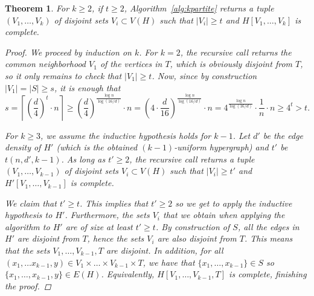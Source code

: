 \documentclass{amsart}
\newtheorem{theorem}[subsection]{Theorem}
\begin{document}
    \begin{theorem}
        For $k \geq 2$, if $t \geq 2$, Algorithm~\ref{alg:kpartite} returns a tuple $(V_1, \dots, V_k)$ of disjoint sets $V_i \subset V(H)$ such that
        $|V_i| \geq t$ and $H[V_1, \dots, V_k]$ is complete.

        \begin{proof}
            We proceed by induction on $k$.
            For $k=2$, the recursive call returns the common neighborhood $V_1$ of the vertices in $T$,
            which is obviously disjoint from $T$, so it only remains to check that $|V_1| \geq t$.
            Now, since by construction $|V_1| = |S| \geq s$, it is enough that
            \[
                s
                = \left\lceil \left( \frac{d}{4}\right)^t \cdot n\right\rceil
                \geq \left( \frac{d}{4}\right)^{\frac{\log n}{\log(16/d)}}  \cdot n
                = \left( 4 \cdot \frac{d}{16}\right)^{\frac{\log n}{\log(16/d)}} \cdot n
                = 4^{\frac{\log n}{\log(16/d)}} \cdot \frac{1}{n} \cdot n
                \geq 4^t
                > t.
            \]

            For $k \geq 3$, we assume the inductive hypothesis holds for $k-1$.
            Let $d'$ be the edge density of $H'$ (which is the obtained $(k-1)$-uniform hypergraph)
            and $t'$ be $t(n, d', k-1)$.
            As long as $t' \geq 2$, the recursive call returns
            a tuple $(V_1, \dots, V_{k-1})$ of disjoint sets $V_i \subset V(H)$ such that
            $|V_i| \geq t'$ and $H'[V_1, \dots, V_{k-1}]$ is complete.

            We claim that $t' \geq t$.
            This implies that $t' \geq 2$ so we get to apply the inductive hypothesis to $H'$.
            Furthermore, the sets $V_i$ that we obtain when applying the algorithm to $H'$
            are of size at least $t' \geq t$.
            By construction of $S$, all the edges in $H'$ are disjoint from $T$,
            hence the sets $V_i$ are also disjoint from $T$.
            This means that the sets $V_1, \dots, V_{k-1}, T$ are disjoint.
            In addition, for all $(x_1, \dots x_{k-1}, y) \in V_1 \times \dots \times V_{k-1} \times T$,
            we have that $\{x_1, \dots, x_{k-1}\} \in S$ so $\{x_1, \dots, x_{k-1}, y\} \in E(H)$.
            Equivalently, $H[V_1, \dots, V_{k-1}, T]$ is complete, finishing the proof.


\end{proof}
\end{theorem}
\end{document}
